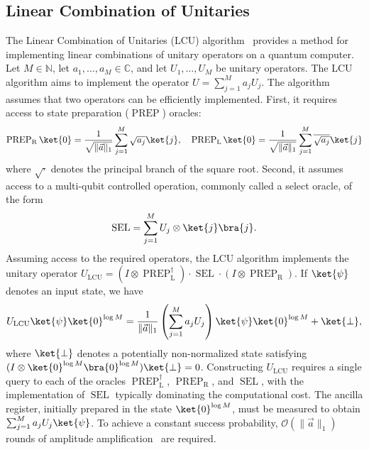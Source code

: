 \documentclass[10pt,reqno]{article}
\numberwithin{equation}{section}
\theoremstyle{plain}
\theoremstyle{definition}
\begin{document}
\subsection{Linear Combination of Unitaries}\label{sec:lcu}
The Linear Combination of Unitaries (LCU) algorithm~\cite{Childs2012lcu} provides a method for implementing linear combinations of unitary operators on a quantum computer. Let \(M \in \mathbb{N}\), let \(a_1,\ldots,a_M \in \mathbb{C}\), and let \(U_1,\ldots,U_M\) be unitary operators. The LCU algorithm aims to implement the operator \(U = \sum_{j=1}^{M} a_j U_j\). The algorithm assumes that two operators can be efficiently implemented. First, it requires access to state preparation (\(\operatorname{PREP}\)) oracles:
\begin{align}\label{F-LCU}
\operatorname{PREP}_{\operatorname{R}} \ket{0}  = \frac{1}{\sqrt{\| \vec a \|_1 }} \sum_{j=1}^{M}  \sqrt{a_{j}}  \ket{j}, \quad \operatorname{PREP}_{\operatorname{L}} \ket{0}  = \frac{1}{\sqrt{\| \vec a \|_1 }} \sum_{j=1}^{M}  \overline{\sqrt{a_{j}}} \ket{j}
\end{align}
where \(\sqrt{\cdot}\) denotes the principal branch of the square root. Second, it assumes access to a multi-qubit controlled operation, commonly called a select oracle, of the form
\begin{equation}\label{controlled-LCU}
    \operatorname{SEL}=\sum_{j=1}^{M} U_j \otimes \ket{j}\bra{j}.
\end{equation} 
Assuming access to the required operators, the LCU algorithm implements the unitary operator $U_{\text{LCU}} = (I \otimes \operatorname{PREP}^\dagger_{\operatorname{L}}) \cdot \operatorname{SEL} \cdot (I \otimes \operatorname{PREP}_{\operatorname{R}})$. If \(\ket{\psi}\) denotes an input state, we have
\begin{equation} U_{\text{LCU}} \ket{\psi} \ket{0}^{\log M} = \frac{1}{\| \vec a \|_1} \left(\sum_{j=1}^{M} a_j U_j\right) \ket{\psi} \ket{0}^{\log M} + \ket{\perp},
\end{equation}
where \(\ket{\perp}\) denotes a potentially non-normalized state satisfying \((I \otimes \ket{0}^{\log M}\bra{0}^{\log M}) \ket{\perp} = 0\). Constructing \(U_{\operatorname{LCU}}\) requires a single query to each of the oracles \(\operatorname{PREP}^\dagger_{\operatorname{L}}\), \(\operatorname{PREP}_{\operatorname{R}}\), and \(\operatorname{SEL}\), with the implementation of \(\operatorname{SEL}\) typically dominating the computational cost. The ancilla register, initially prepared in the state \(\ket{0}^{\log M}\), must be measured to obtain \(\sum_{j=1}^{M} a_j U_j\ket{\psi}\). To achieve a constant success probability, \(\mathcal{O}(\|\vec{a}\|_1)\) rounds of amplitude amplification~\cite{childs2015lcutaylor} are required. 
\end{document}
